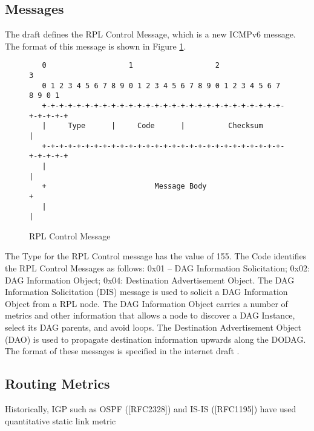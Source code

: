 \subsection{Messages}
The draft \cite{draft-rpl-04} defines the RPL Control Message, which is a new ICMPv6 message. The format of this message is shown in Figure \ref{fig:rpl.control.message}.
\begin{figure}[htp]
\begin{mylisting}
\begin{verbatim}
   0                   1                   2                   3
   0 1 2 3 4 5 6 7 8 9 0 1 2 3 4 5 6 7 8 9 0 1 2 3 4 5 6 7 8 9 0 1
   +-+-+-+-+-+-+-+-+-+-+-+-+-+-+-+-+-+-+-+-+-+-+-+-+-+-+-+-+-+-+-+-+
   |     Type      |     Code      |          Checksum             |
   +-+-+-+-+-+-+-+-+-+-+-+-+-+-+-+-+-+-+-+-+-+-+-+-+-+-+-+-+-+-+-+-+
   |                                                               |
   +                         Message Body                          +
   |                                                               |
\end{verbatim}
\end{mylisting}
\caption{RPL Control Message}\label{fig:rpl.control.message}
\end{figure}

The Type for the RPL Control message has the value of 155. The Code identifies the RPL Control Messages as follows:  0x01 -- DAG Information Solicitation; 0x02: DAG Information Object; 0x04: Destination Advertisement Object. The DAG Information Solicitation (DIS) message is used to solicit a DAG Information Object from a RPL node. The DAG Information Object carries a number of metrics and other information that allows a node to discover a DAG Instance, select its DAG parents, and avoid loops. The Destination Advertisement Object (DAO) is used to propagate destination information upwards along the DODAG. The format of these messages is specified in the internet draft \cite{draft-rpl-04}.

\subsection{Routing Metrics}
Historically, IGP such as OSPF ([RFC2328]) and IS-IS ([RFC1195]) have used quantitative static link metric

